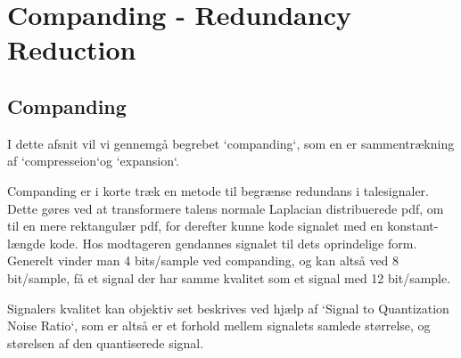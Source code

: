 \chapter{Companding - Redundancy Reduction}
\label{ch:part1}

\section{Companding}

I dette afsnit vil vi gennemgå begrebet `companding`, som en er sammentrækning af `compresseion`og `expansion`. 

Companding er i korte træk en metode til begrænse redundans i talesignaler. Dette gøres ved at transformere talens normale Laplacian distribuerede pdf, om til en mere rektangulær pdf, for derefter kunne kode signalet med en konstant-længde kode. Hos modtageren gendannes signalet til dets oprindelige form. Generelt vinder man 4 bits/sample ved companding, og kan altså ved 8 bit/sample, få et signal der har samme kvalitet som et signal med 12 bit/sample. 

Signalers kvalitet kan objektiv set beskrives ved hjælp af `Signal to Quantization Noise Ratio`, som er altså er et forhold mellem signalets samlede størrelse, og størelsen af den quantiserede signal. 